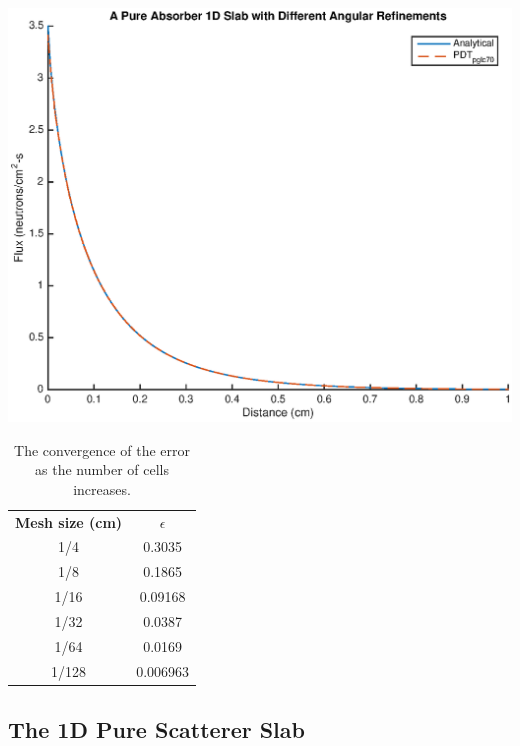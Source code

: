\noindent\begin{minipage}{\textwidth}
\centering
\includegraphics[scale = 0.8]{figures/PureAbsorberBestangle.eps}
\label{pa_bestangle}
\end{minipage}
\smallskip

\begin{table}[H]
\centering
\caption{The convergence of the error as the number of cells increases.}
\begin{tabular}{c c}
\hline
\textbf{Mesh size (cm)} & \textbf{$\epsilon$} \\
1/4 & 0.3035 \\
1/8 & 0.1865 \\
1/16 & 0.09168 \\
1/32 & 0.0387 \\
1/64 & 0.0169 \\
1/128 & 0.006963 \\
\hline
\end{tabular}
\label{flux_errors}
\end{table}
\smallskip

\subsection{The 1D Pure Scatterer Slab}

